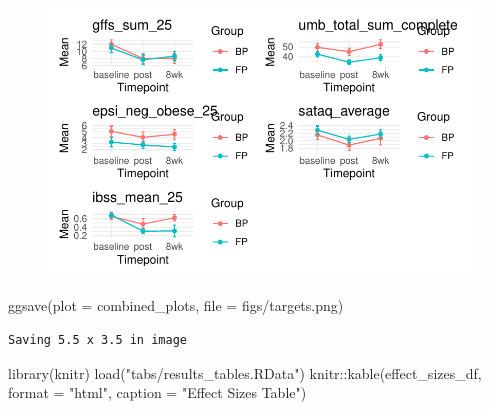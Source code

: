 \documentclass[
  letterpaper,
  DIV=11,
  numbers=noendperiod]{scrreprt}
\newenvironment{Shaded}{\begin{snugshade}}{\end{snugshade}}
\newcommand{\AttributeTok}[1]{\textcolor[rgb]{0.40,0.45,0.13}{#1}}
\newcommand{\FunctionTok}[1]{\textcolor[rgb]{0.28,0.35,0.67}{#1}}
\newcommand{\NormalTok}[1]{\textcolor[rgb]{0.00,0.23,0.31}{#1}}
\newcommand{\SpecialCharTok}[1]{\textcolor[rgb]{0.37,0.37,0.37}{#1}}
\newcommand{\StringTok}[1]{\textcolor[rgb]{0.13,0.47,0.30}{#1}}
\begin{document}
\begin{figure}[H]

{\centering \includegraphics{./InterventionEffects.KS_files/figure-pdf/unnamed-chunk-5-1.pdf}

}

\end{figure}

\begin{Shaded}
\begin{Highlighting}[]
\FunctionTok{ggsave}\NormalTok{(}\AttributeTok{plot =}\NormalTok{ combined\_plots, }\AttributeTok{file =} \StringTok{\textquotesingle{}figs/targets.png\textquotesingle{}}\NormalTok{)}
\end{Highlighting}
\end{Shaded}

\begin{verbatim}
Saving 5.5 x 3.5 in image
\end{verbatim}

\begin{Shaded}
\begin{Highlighting}[]
\FunctionTok{library}\NormalTok{(knitr)}
\FunctionTok{load}\NormalTok{(}\StringTok{"tabs/results\_tables.RData"}\NormalTok{)}
\NormalTok{knitr}\SpecialCharTok{::}\FunctionTok{kable}\NormalTok{(effect\_sizes\_df, }\AttributeTok{format =} \StringTok{"html"}\NormalTok{, }\AttributeTok{caption =} \StringTok{"Effect Sizes Table"}\NormalTok{)}
\end{Highlighting}
\end{Shaded}
\end{document}
